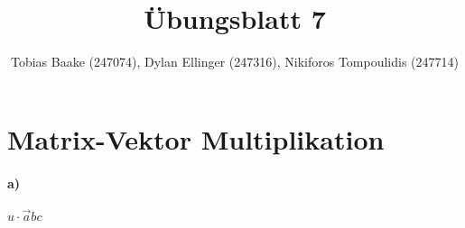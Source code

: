 \documentclass{article}
\title{Übungsblatt 7}
\author{Tobias Baake (247074), Dylan Ellinger (247316), Nikiforos Tompoulidis (247714)}
\begin{document}
\maketitle

\section{Matrix-Vektor Multiplikation}

\paragraph{a)}
$ u \cdot \vec{a}{b}{c} $
\end{document}
